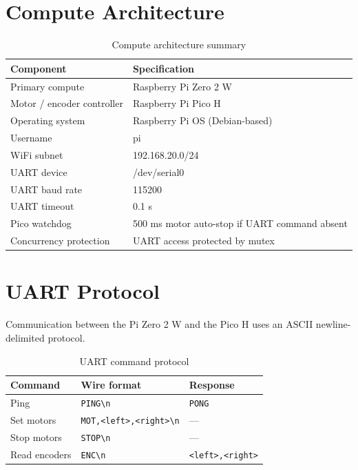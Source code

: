 \documentclass[a4paper,oneside,titlepage,11pt]{report}
\begin{document}
\section{Compute Architecture}
\begin{table}[H]
\centering
\caption{Compute architecture summary}
\label{tab:compute_arch}
\begin{tabular}{ll}
\toprule
\textbf{Component} & \textbf{Specification} \\
\midrule
Primary compute & Raspberry Pi Zero 2 W \\
Motor / encoder controller & Raspberry Pi Pico H \\
Operating system & Raspberry Pi OS (Debian-based) \\
Username & pi \\
WiFi subnet & 192.168.20.0/24 \\
UART device & /dev/serial0 \\
UART baud rate & 115200 \\
UART timeout & 0.1 s \\
Pico watchdog & 500 ms motor auto-stop if UART command absent \\
Concurrency protection & UART access protected by mutex \\
\bottomrule
\end{tabular}
\end{table}

\section{UART Protocol}
Communication between the Pi Zero 2 W and the Pico H uses an ASCII newline-delimited protocol.

\begin{table}[H]
\centering
\caption{UART command protocol}
\label{tab:uart_protocol}
\begin{tabular}{lll}
\toprule
\textbf{Command} & \textbf{Wire format} & \textbf{Response} \\
\midrule
Ping & \texttt{PING\textbackslash n} & \texttt{PONG} \\
Set motors & \texttt{MOT,<left>,<right>\textbackslash n} & --- \\
Stop motors & \texttt{STOP\textbackslash n} & --- \\
Read encoders & \texttt{ENC\textbackslash n} & \texttt{<left>,<right>} \\
\bottomrule
\end{tabular}
\end{table}
\end{document}
